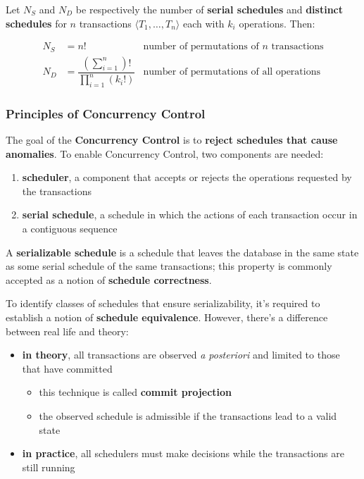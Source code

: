 \documentclass[english]{article}
\begin{document}
Let \(N_S\) and \(N_D\) be respectively the number of \textbf{serial schedules} and \textbf{distinct schedules} for \(n\) transactions \(\langle T_1, \dots, T_n \rangle\) each with \(k_i\) operations.
Then:

\begin{align*}
  N_S & = n!                                                                                        \quad & \text{number of permutations of } n \text{ transactions} \\[0.5ex]
  N_D & = \dfrac{\displaystyle \left(\sum_{i=1}^{n}\right)!}{\displaystyle \prod_{i=1}^{n} (k_i!)}        & \text{number of permutations of all operations}
\end{align*}

\subsubsection{Principles of Concurrency Control}

The goal of the \textbf{Concurrency Control} is to \textbf{reject schedules that cause anomalies}.
To enable Concurrency Control, two components are needed:

\begin{enumerate}
  \item \textbf{scheduler}, a component that accepts or rejects the operations requested by the transactions
  \item \textbf{serial schedule}, a schedule in which the actions of each transaction occur in a contiguous sequence
\end{enumerate}

\bigskip
A \textbf{serializable schedule} is a schedule that leaves the database in the same state as some serial schedule of the same transactions;
this property is commonly accepted as a notion of \textbf{schedule correctness}.

To identify classes of schedules that ensure serializability, it's required to establish a notion of \textbf{schedule equivalence}.
However, there's a difference between real life and theory:

\begin{itemize}
  \item \textbf{in theory}, all transactions are observed \textit{a posteriori} and limited to those that have committed
        \begin{itemize}
          \item this technique is called \textbf{commit projection}
          \item the observed schedule is admissible if the transactions lead to a valid state
        \end{itemize}
  \item \textbf{in practice}, all schedulers must make decisions while the transactions are still running
\end{itemize}
\end{document}
